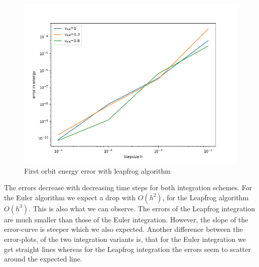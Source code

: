 \documentclass[11pt, a4paper, reqno]{scrartcl}
\begin{document}
    		\begin{figure}[H]
    			\centering
    			\includegraphics[height=.33\paperheight]{fig_b2.png}
    			\caption{First orbit energy error with leapfrog algorithm}
    		\end{figure}
    		
    		The errors decrease with decreasing time steps for both integration 
    		schemes. For the Euler algorithm we expect a drop with $O(h^2)
    		$, for the Leapfrog algorithm $O(h^3)$. This is also what we can observe. The errors of the Leapfrog integration are much smaller than those of the Euler integration. However, the slope of the error-curve is 
    		steeper which we also expected. Another difference between the error-plots, of the two integration variants is, that for the Euler integration we get straight lines whereas for the Leapfrog integration the errors seem to scatter around the expected line. 
\end{document}
